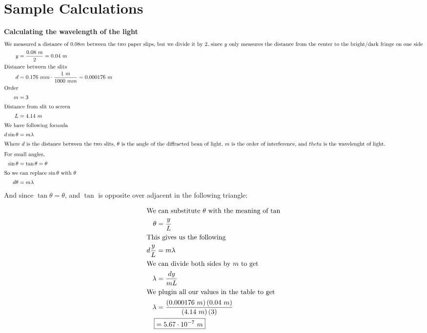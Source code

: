 \documentclass[12pt]{article}
\begin{document}
\section{Sample Calculations}
\textbf{Calculating the wavelength of the light}
\begin{align*}
	\intertext{We measured a distance of \(0.08 m\) between the two paper slips, but we divide it by 2, since \(y\) only measures the distance from the center to the bright/dark fringe on one side}
	y           & =\frac{0.08\ m}{2}=0.04\ m                       \\
	\intertext{Distance between the slits}
	d           & =0.176\ mm\cdot\frac{1\ m}{1000\ mm}=0.000176\ m \\
	\intertext{Order}
	m           & =3                                               \\
	\intertext{Distance from slit to screen}
	L           & =4.14\ m                                         \\
	\intertext{We have following formula}
	d\sin\theta & =m\lambda                                        \\
	\intertext{Where \(d\) is the distance between the two slits, \(\theta\) is the angle of the diffracted bean of light, \(m\) is the order of interference, and \(theta\) is the wavelenght of light.}
	\intertext{For small angles, }
	\sin\theta  & =\tan\theta=\theta                               \\
	\intertext{So we can replace \(\sin\theta\) with \(\theta\) }
	d\theta     & =m\lambda
\end{align*}
And since \(\tan\theta=\theta\), and \(\tan\) is opposite over adjacent in the following triangle:
\begin{figure}[H]
	\begin{center}
	\end{center}
\end{figure}
\begin{align*}
	\intertext{We can substitute \(\theta\) with the meaning of \(\tan\)}
	\theta       & =\frac{y}{L}                                                                             \\
	\intertext{This gives us the following}
	d\frac{y}{L} & =m\lambda                                                                                \\
	\intertext{We can divide both sides by \(m\) to get}
	\lambda      & =\frac{dy}{mL}                                                                           \\
	\intertext{We plugin all our values in the table to get}
	\lambda      & =\frac{\left(0.000176\ m\right)\left(0.04\ m\right)}{\left(4.14\ m\right)\left(3\right)} \\
	\Aboxed{     & =5.67\cdot10^{-7}\ m}
\end{align*}
\end{document}
